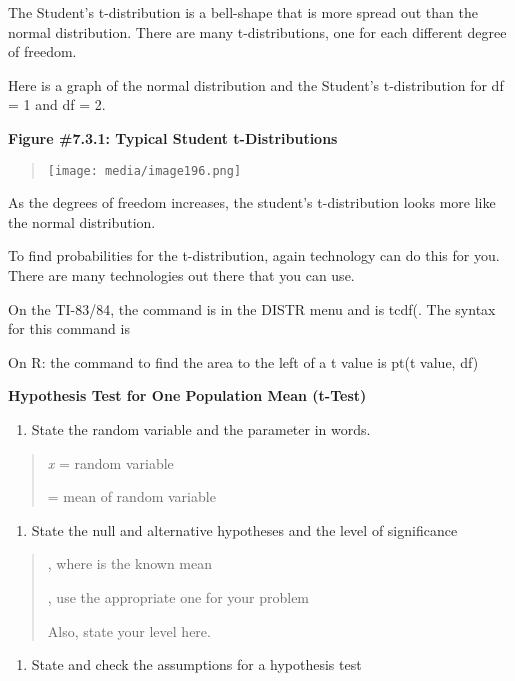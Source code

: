 \documentclass[]{book}
\providecommand{\tightlist}{%
  \setlength{\itemsep}{0pt}\setlength{\parskip}{0pt}}
\begin{document}
The Student's t-distribution is a bell-shape that is more spread out
than the normal distribution. There are many t-distributions, one for
each different degree of freedom.

Here is a graph of the normal distribution and the Student's
t-distribution for df = 1 and df = 2.

\textbf{Figure \#7.3.1: Typical Student t-Distributions}

\begin{quote}
\texttt{[image: media/image196.png]}
\end{quote}

As the degrees of freedom increases, the student's t-distribution looks
more like the normal distribution.

To find probabilities for the t-distribution, again technology can do
this for you. There are many technologies out there that you can use.

On the TI-83/84, the command is in the DISTR menu and is tcdf(. The
syntax for this command is

On R: the command to find the area to the left of a t value is pt(t
value, df)

\textbf{Hypothesis Test for One Population Mean (t-Test)}

\begin{enumerate}
\def\labelenumi{\arabic{enumi}.}
\tightlist
\item
  State the random variable and the parameter in words.
\end{enumerate}

\begin{quote}
\emph{x} = random variable

= mean of random variable
\end{quote}

\begin{enumerate}
\def\labelenumi{\arabic{enumi}.}
\setcounter{enumi}{1}
\tightlist
\item
  State the null and alternative hypotheses and the level of
  significance
\end{enumerate}

\begin{quote}
, where is the known mean

, use the appropriate one for your problem

Also, state your level here.
\end{quote}

\begin{enumerate}
\def\labelenumi{\arabic{enumi}.}
\setcounter{enumi}{2}
\tightlist
\item
  State and check the assumptions for a hypothesis test
\end{enumerate}
\end{document}
